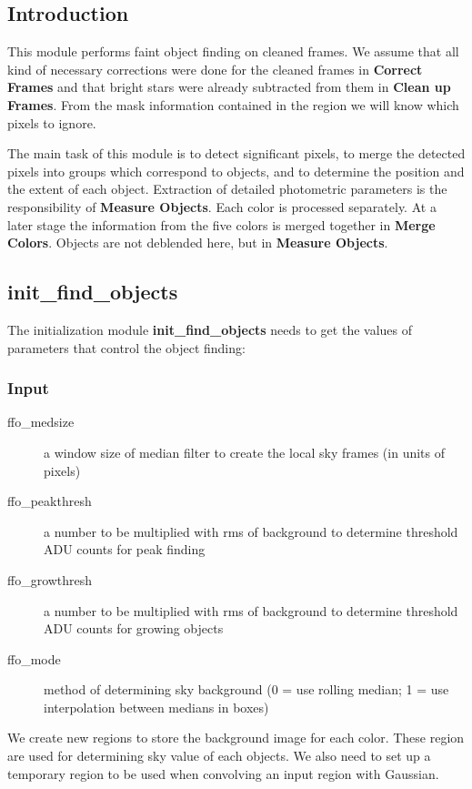 \subsection{Introduction}

This module performs faint object finding on cleaned frames.
We assume that all kind of necessary corrections were done
for the cleaned frames in {\bf Correct Frames} and that
bright stars were already subtracted from them in 
{\bf Clean up Frames}. 
From the mask information contained in the region we will know which
pixels to ignore.

The main task of this module is to detect significant pixels,
to merge the detected pixels into groups which correspond to
objects, and to determine the position and the extent of each 
object. Extraction of detailed photometric parameters is
the responsibility of {\bf Measure Objects}.
Each color is processed separately.  At a later stage the information from
the five colors is merged together in {\bf Merge Colors}.
Objects are not deblended here, but in {\bf Measure Objects}.

\subsection{init\_find\_objects}

The initialization module {\bf init\_find\_objects} needs to get the values 
of parameters that control the object finding:

\subsubsection {Input}

\begin{description}
 \item[\qquad ffo\_medsize] a window size of median filter to create
the local sky frames (in units of pixels)
 \item[\qquad ffo\_peakthresh] a number to be multiplied with rms of
background to determine threshold ADU counts for peak finding
 \item[\qquad ffo\_growthresh] a number to be multiplied with rms of
background to determine threshold ADU counts for growing objects
 \item[\qquad ffo\_mode] method of determining sky background (0 = use 
rolling median; 1 = use interpolation between medians in boxes)
\end{description}

We create new regions to store the background image for each
color. These region are used for determining sky value of each objects. 
We also need to set up a temporary region to be used when convolving
an input region with Gaussian. 

